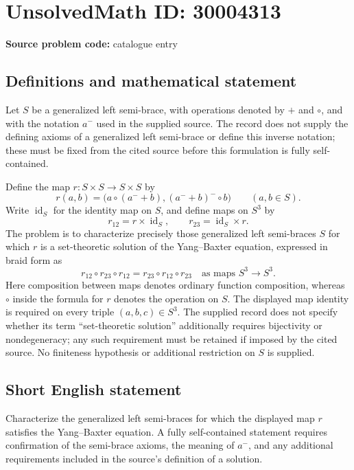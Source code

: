 \documentclass[11pt]{article}
\begin{document}
\section*{UnsolvedMath ID: 30004313}
\textbf{Source problem code:} catalogue entry
\subsection{Definitions and mathematical statement}
Let \(S\) be a generalized left semi-brace, with operations denoted by \(+\) and \(\circ\), and with the notation \(a^{-}\) used in the supplied source. The record does not supply the defining axioms of a generalized left semi-brace or define this inverse notation; these must be fixed from the cited source before this formulation is fully self-contained.

Define the map \(r\colon S\times S\to S\times S\) by
\[
r(a,b)=\bigl(a\circ(a^{-}+b),(a^{-}+b)^{-}\circ b\bigr)
\qquad(a,b\in S).
\]
Write \(\operatorname{id}_S\) for the identity map on \(S\), and define maps on \(S^3\) by
\[
r_{12}=r\times\operatorname{id}_S,
\qquad
r_{23}=\operatorname{id}_S\times r.
\]
The problem is to characterize precisely those generalized left semi-braces \(S\) for which \(r\) is a set-theoretic solution of the Yang--Baxter equation, expressed in braid form as
\[
r_{12}\circ r_{23}\circ r_{12}
=
r_{23}\circ r_{12}\circ r_{23}
\quad\text{as maps }S^3\longrightarrow S^3.
\]
Here composition between maps denotes ordinary function composition, whereas \(\circ\) inside the formula for \(r\) denotes the operation on \(S\). The displayed map identity is required on every triple \((a,b,c)\in S^3\). The supplied record does not specify whether its term ``set-theoretic solution'' additionally requires bijectivity or nondegeneracy; any such requirement must be retained if imposed by the cited source. No finiteness hypothesis or additional restriction on \(S\) is supplied.
\subsection{Short English statement}
Characterize the generalized left semi-braces for which the displayed map \(r\) satisfies the Yang--Baxter equation. A fully self-contained statement requires confirmation of the semi-brace axioms, the meaning of \(a^{-}\), and any additional requirements included in the source's definition of a solution.
\end{document}
